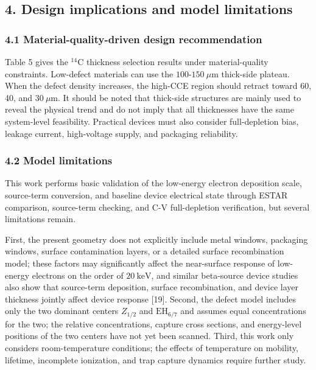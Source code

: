 \documentclass[
  10pt,
  a4paper,
]{article}
\begin{document}
\subsection{4. Design implications and model
limitations}\label{design-implications-and-model-limitations}

\subsubsection{4.1 Material-quality-driven design
recommendation}\label{material-quality-driven-design-recommendation}

Table 5 gives the \(^{14}\mathrm{C}\) thickness selection results under
material-quality constraints. Low-defect materials can use the
\(100\)-\(150\ \mu\mathrm{m}\) thick-side plateau. When the defect
density increases, the high-CCE region should retract toward 60, 40, and
\(30\ \mu\mathrm{m}\). It should be noted that thick-side structures are
mainly used to reveal the physical trend and do not imply that all
thicknesses have the same system-level feasibility. Practical devices
must also consider full-depletion bias, leakage current, high-voltage
supply, and packaging reliability.

\subsubsection{4.2 Model limitations}\label{model-limitations}

This work performs basic validation of the low-energy electron
deposition scale, source-term conversion, and baseline device electrical
state through ESTAR comparison, source-term checking, and C-V
full-depletion verification, but several limitations remain.

First, the present geometry does not explicitly include metal windows,
packaging windows, surface contamination layers, or a detailed surface
recombination model; these factors may significantly affect the
near-surface response of low-energy electrons on the order of
\(20\ \mathrm{keV}\), and similar beta-source device studies also show
that source-term deposition, surface recombination, and device layer
thickness jointly affect device response {[}19{]}. Second, the defect
model includes only the two dominant centers \(Z_{1/2}\) and
\(\mathrm{EH}_{6/7}\) and assumes equal concentrations for the two; the
relative concentrations, capture cross sections, and energy-level
positions of the two centers have not yet been scanned. Third, this work
only considers room-temperature conditions; the effects of temperature
on mobility, lifetime, incomplete ionization, and trap capture dynamics
require further study.
\end{document}
